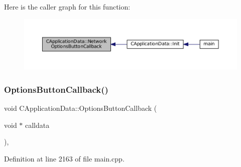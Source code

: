 Here is the caller graph for this function\+:\nopagebreak
\begin{figure}[H]
\begin{center}
\leavevmode
\includegraphics[width=350pt]{classCApplicationData_ad41dbc2f54ee638aa64a1d0c22b3fba9_icgraph}
\end{center}
\end{figure}
\hypertarget{classCApplicationData_a3647cf78eb59689b901d4204c81555b4}{}\label{classCApplicationData_a3647cf78eb59689b901d4204c81555b4} 
\subsubsection{\texorpdfstring{Options\+Button\+Callback()}{OptionsButtonCallback()}}
{\footnotesize\ttfamily void C\+Application\+Data\+::\+Options\+Button\+Callback (\begin{DoxyParamCaption}\item[{void $\ast$}]{calldata }\end{DoxyParamCaption})\hspace{0.3cm}{\ttfamily [static]}, {\ttfamily [protected]}}



Definition at line 2163 of file main.\+cpp.


